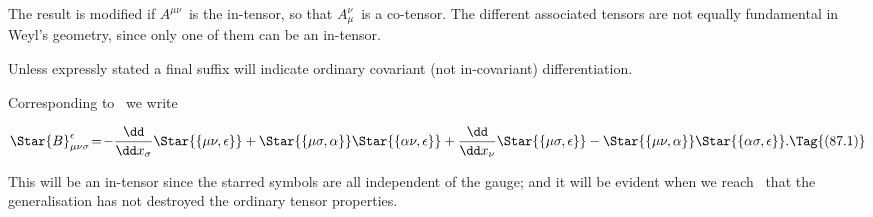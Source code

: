 \documentclass[12pt]{book}
\begin{document}
The result is modified if $A^{\mu\nu}$~is the in-tensor, so that $A_{\mu}^{\nu}$~is a co-tensor. The
different associated tensors are not equally fundamental in Weyl's geometry,
since only one of them can be an in-tensor.

Unless expressly stated a final suffix will indicate ordinary covariant (not
in-covariant) differentiation.

%

Corresponding to~ we write

\[
\Star{B}_{\mu\nu\sigma}^{\epsilon}
\!=\! -\frac{\dd}{\dd x_{\sigma}} \Star{\{\mu\nu, \epsilon\}}
  + \Star{\{\mu\sigma, \alpha\}} \Star{\{\alpha\nu, \epsilon\}}
  + \frac{\dd}{\dd x_{\nu}} \Star{\{\mu\sigma, \epsilon\}}
  - \Star{\{\mu\nu, \alpha\}} \Star{\{\alpha\sigma, \epsilon\}}.
  \Tag{(87.1)}
\]

This will be an in-tensor since the starred symbols are all independent of
the gauge; and it will be evident when we reach~ that the generalisation
has not destroyed the ordinary tensor properties.
\end{document}
